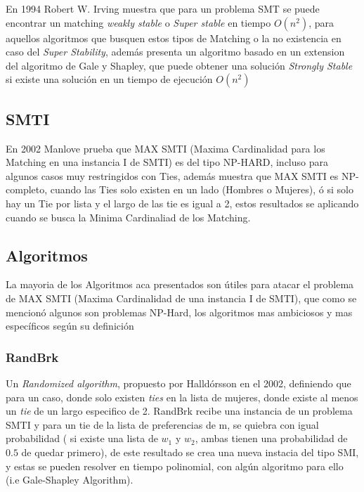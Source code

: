 \documentclass[letter, 10pt]{article}
\begin{document}
En 1994 Robert W. Irving muestra que para un problema SMT se puede encontrar un matching \textit{weakly stable} 
o \textit{Super stable} en tiempo $O(n^2)$, para aquellos algoritmos que busquen estos tipos de Matching
 o la no existencia en caso del \textit{Super Stability}, adem\'as presenta un algoritmo basado en un extension del 
 algoritmo de Gale y Shapley, que puede obtener una soluci\'on \textit{Strongly Stable} si existe una soluci\'on en un 
 tiempo de ejecuci\'on $O(n^2)$\cite{Irving94}
 
\subsection{SMTI}

En 2002 Manlove prueba que MAX SMTI (Maxima Cardinalidad para los Matching en una instancia I de SMTI)
es del tipo NP-HARD, incluso para algunos casos muy restringidos con Ties, adem\'as 
muestra que MAX SMTI es NP-completo, cuando las Ties solo existen en un lado (Hombres o Mujeres), \'o si solo hay
un Tie por lista y el largo de las tie es igual a 2, estos resultados se aplicando cuando se busca la Minima Cardinaliad de 
los Matching\cite{ManloveIrving02Hard}.

\subsection{Algoritmos}

La mayoria de los Algoritmos aca presentados son \'utiles para atacar el problema de MAX SMTI (Maxima Cardinalidad de una 
instancia I de SMTI), que como se mencion\'o algunos son problemas NP-Hard, los algoritmos mas ambiciosos y mas espec\'ificos seg\'un su
definici\'on
\subsubsection{RandBrk}
	Un \textit{Randomized algorithm}, propuesto por Halld\'orsson 
en el 2002, definiendo que para un caso, donde solo existen \textit{ties} en la lista de mujeres, donde existe al menos un 
\textit{tie} de un largo especifico de 2. \indent RandBrk recibe una instancia de un problema SMTI y para un tie de la lista de 
preferencias de m, se quiebra con igual probabilidad ( si existe una
lista de $w_1$ y $w_2$, ambas tienen una probabilidad de $0.5$ de
quedar primero), de este resultado se crea una nueva instacia del 
tipo SMI, y estas se pueden resolver en tiempo polinomial, con alg\'un
algoritmo para ello (i.e Gale-Shapley Algorithm)\cite{MagnusKazuo04Rand}.
\end{document}
